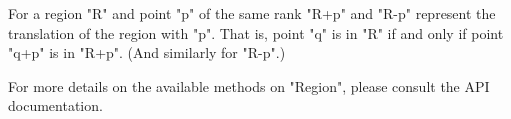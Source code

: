 For a region \xcdmath"R" and point \xcdmath"p" of the same rank 
\xcdmath"R+p" and \xcdmath"R-p" represent the translation of the region
with \xcdmath"p". That is, point \xcdmath"q" is in 
\xcdmath"R" if and only if point \xcdmath"q+p" is in \xcdmath"R+p". (And similarly
for \xcdmath"R-p".)



For more details on the available methods on \xcdmath"Region", please
consult the API documentation.
